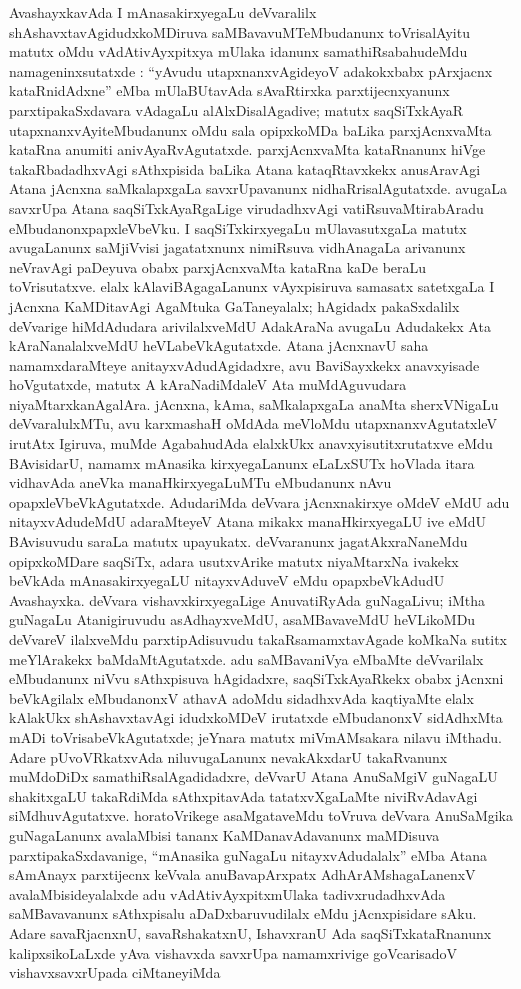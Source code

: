 AvashayxkavAda I mAnasakirxyegaLu deVvaralilx shAshavxtavAgidudxkoMDiruva saMBava\-vuMTeMbudanunx toVrisalAyitu matutx oMdu vAdAtivAyxpitxya  mUlaka idanunx samathiRsabahudeMdu namageninxsutatxde : ``yAvudu utapxnanxvAgideyoV adakokxbabx pArxjacnx kataRnidAdxne'' eMba mUlaBUtavAda sAvaR\-tirxka parxtijecnxyanunx parxtipakaSxdavara vAdagaLu alAlxDisalAgadive; matutx saqSiTxkAyaR utapxnanx\-vAyiteMbudanunx oMdu sala opipxkoMDa baLika parxjAcnxvaMta kataRna anumiti ani\-vAyaRvAgutatxde. parxjAcnxvaMta kataRnanunx hiVge takaRbadadhxvAgi sAthxpisida baLika Atana kataqRtavxkekx anusAravAgi Atana jAcnxna saMkalapxgaLa savxrUpavanunx nidhaRrisalAgutatxde. avu\-gaLa savxrUpa Atana saqSiTxkAyaRgaLige virudadhxvAgi vatiRsuvaMtirabAradu eMbuda\-nonxpapxleVbeVku. I saqSiTxkirxyegaLu mUlavasutxgaLa matutx avugaLanunx saMjiVvisi jaga\-tatxnunx nimiRsuva vidhAnagaLa arivanunx neVravAgi paDeyuva obabx parxjAcnxvaMta kataRna kaDe beraLu toVrisutatxve. elalx kAlaviBAgagaLanunx vAyxpisiruva samasatx satetxgaLa I jAcnxna KaMDitavAgi AgaMtuka GaTaneyalalx; hAgidadx pakaSxdalilx deVvarige hiMdAdudara arivilalxveMdU AdakAraNa avugaLu Adudakekx Ata kAraNanalalxveMdU heVLabeVkAgutatxde. Atana jAcnxnavU saha namamxdaraMteye anitayxvAdudAgidadxre, avu BaviSayxkekx anavxyisade hoVgutatxde, matutx A kAraNadiMdaleV Ata muMdAguvudara niyaMtarxkanAgalAra. jAcnxna, kAma, saMkalapxgaLa anaMta sherxVNigaLu deVvaralulxMTu, avu karxmashaH oMdAda meVloMdu utapxnanxvAgutatxleV irutAtx Igiruva, muMde AgabahudAda elalxkUkx anavxyisutitxrutatxve eMdu BAvisidarU, namamx mAnasika kirxyegaLanunx eLaLxSUTx hoVlada itara vidhavAda aneVka manaHkirxyegaLuMTu eMbudanunx nAvu opapxleVbeVkAgutatxde. AdudariMda deVvara jAcnxnakirxye oMdeV eMdU adu nitayxvAdudeMdU adaraMteyeV Atana mikakx manaHkirxyegaLU ive eMdU BAvisuvudu saraLa matutx upayukatx. deVvaranunx jagatAkxraNaneMdu opipxkoMDare saqSiTx, adara usutxvArike matutx niyaM\-tarxNa ivakekx beVkAda mAnasakirxyegaLU nitayxvAduveV eMdu opapxbeVkAdudU Avashayxka. deVvara vishavxkirxyegaLige AnuvatiRyAda guNagaLivu; iMtha guNagaLu Atanigiruvudu asAdhayxveMdU, asaMBavaveMdU heVLikoMDu deVvareV ilalxveMdu parxtipAdisuvudu takaRsamamxtavAgade koMkaNa sutitx meYlArakekx baMdaMtAgutatxde. adu saMBavaniVya eMbaMte deVvarilalx eMbudanunx niVvu sAthxpisuva hAgidadxre, saqSiTxkAyaRkekx obabx jAcnxni beVkAgilalx eMbudanonxV athavA adoMdu sidadhxvAda kaqtiyaMte elalx kAlakUkx shAshavxtavAgi idudxkoMDeV irutatxde eMbudanonxV sidAdhxMta mADi toVrisabeVkAgu\-tatxde; jeYnara matutx miVmAMsakara nilavu iMthadu. Adare pUvoVRkatxvAda niluvu\-gaLanunx nevakAkxdarU takaRvanunx muMdoDiDx samathiRsalAgadidadxre, deVvarU Atana AnuSaMgiV guNagaLU shakitxgaLU takaRdiMda sAthxpitavAda tatatxvXgaLaMte niviRvAdavAgi siMdhuvAgutatxve. horatoVrikege asaMgataveMdu toVruva deVvara AnuSaMgika guNagaLanunx avalaMbisi tananx KaMDanavAdavanunx maMDisuva parxtipakaSxdavanige, ``mAnasika guNagaLu nitayxvAdudalalx'' eMba Atana sAmAnayx parxtijecnx keVvala anuBavapArxpatx AdhArAMshagaLanenxV avalaMbisideyalalxde adu vAdAtivAyxpitxmUlaka tadivxrudadhxvAda saMBavavanunx sAthxpisalu aDaDxbaruvudilalx eMdu jAcnxpisidare sAku. Adare savaRjacnxnU, savaRshakatxnU, IshavxranU Ada saqSiTxkataRnanunx kalipxsikoLaLxde yAva vishavxda savxrUpa namamxrivige goVcarisadoV vishavxsavxrUpada ciMtaneyiMda 